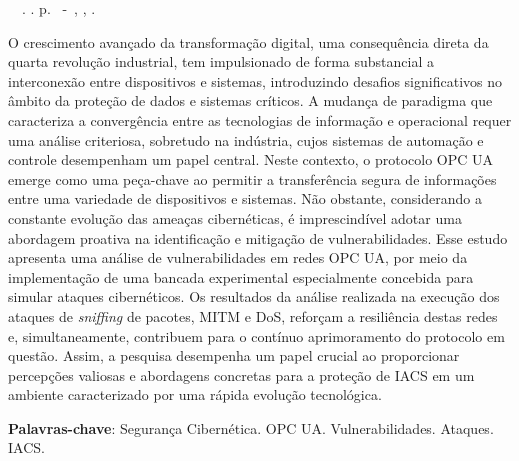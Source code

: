 \setlength{\absparsep}{18pt} %
\begin{resumo}
	\begin{flushleft} 
			\setlength{\absparsep}{0pt} %
			\SingleSpacing 
			\imprimirautorabr~~\textbf{\imprimirtituloresumo}.	\imprimirdata. \pageref{LastPage}p. 
			\imprimirtipotrabalho~-~\imprimirinstituicao, \imprimirlocal, \imprimirdata. 
 	\end{flushleft}
\OnehalfSpacing

O crescimento avançado da transformação digital, uma consequência direta da quarta revolução industrial, tem impulsionado de forma substancial a interconexão entre dispositivos e sistemas, introduzindo desafios significativos no âmbito da proteção de dados e sistemas críticos. A mudança de paradigma que caracteriza a convergência entre as tecnologias de informação e operacional requer uma análise criteriosa, sobretudo na indústria, cujos sistemas de automação e controle desempenham um papel central. Neste contexto, o protocolo OPC UA emerge como uma peça-chave ao permitir a transferência segura de informações entre uma variedade de dispositivos e sistemas. Não obstante, considerando a constante evolução das ameaças cibernéticas, é imprescindível adotar uma abordagem proativa na identificação e mitigação de vulnerabilidades. Esse estudo apresenta uma análise de vulnerabilidades em redes OPC UA, por meio da implementação de uma bancada experimental especialmente concebida para simular ataques cibernéticos. Os resultados da análise realizada na execução dos ataques de \textit{sniffing} de pacotes, MITM e DoS, reforçam a resiliência destas redes e, simultaneamente, contribuem para o contínuo aprimoramento do protocolo em questão. Assim, a pesquisa desempenha um papel crucial ao proporcionar percepções valiosas e abordagens concretas para a proteção de IACS em um ambiente caracterizado por uma rápida evolução tecnológica.
 
 \textbf{Palavras-chave}: Segurança Cibernética. OPC UA. Vulnerabilidades. Ataques. IACS.
\end{resumo}